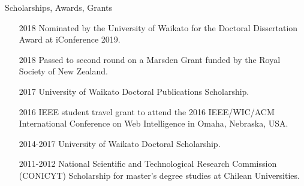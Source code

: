\documentclass[handout]{beamer}
\begin{document}
\begin{frame}{Scholarships, Awards, Grants}
\begin{scriptsize}
  \begin{enumerate}
 \item[2018] Nominated by the University of Waikato for the Doctoral Dissertation Award at iConference 2019.
 \item[2018] Passed to second round on a Marsden Grant funded by the Royal Society of New Zealand.
\item[2017] University of Waikato Doctoral Publications Scholarship.

\item[2016] IEEE student travel grant to attend the 2016
IEEE/WIC/ACM International Conference on Web Intelligence in Omaha, Nebraska, USA.

\item[2014-2017]  University of Waikato Doctoral Scholarship.

\item[2011-2012]  National Scientific and Technological Research Commission (CONICYT) Scholarship for master's degree studies at Chilean Universities.
  \end{enumerate} 
\end{scriptsize}

\end{frame}
\end{document}
